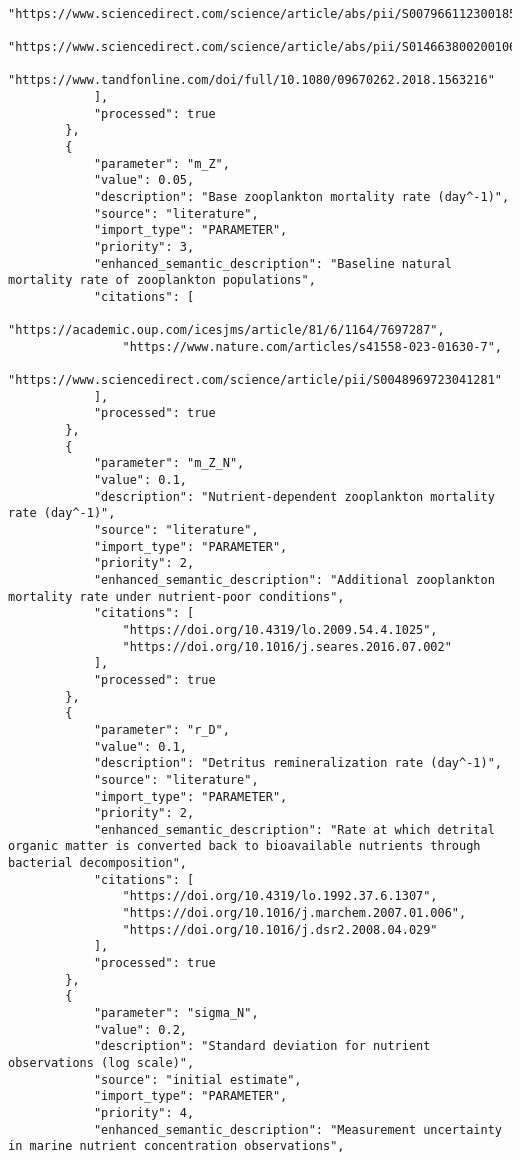 \begin{lstlisting}
                "https://www.sciencedirect.com/science/article/abs/pii/S0079661123001854",
                "https://www.sciencedirect.com/science/article/abs/pii/S0146638002001067",
                "https://www.tandfonline.com/doi/full/10.1080/09670262.2018.1563216"
            ],
            "processed": true
        },
        {
            "parameter": "m_Z",
            "value": 0.05,
            "description": "Base zooplankton mortality rate (day^-1)",
            "source": "literature",
            "import_type": "PARAMETER",
            "priority": 3,
            "enhanced_semantic_description": "Baseline natural mortality rate of zooplankton populations",
            "citations": [
                "https://academic.oup.com/icesjms/article/81/6/1164/7697287",
                "https://www.nature.com/articles/s41558-023-01630-7",
                "https://www.sciencedirect.com/science/article/pii/S0048969723041281"
            ],
            "processed": true
        },
        {
            "parameter": "m_Z_N",
            "value": 0.1,
            "description": "Nutrient-dependent zooplankton mortality rate (day^-1)",
            "source": "literature",
            "import_type": "PARAMETER",
            "priority": 2,
            "enhanced_semantic_description": "Additional zooplankton mortality rate under nutrient-poor conditions",
            "citations": [
                "https://doi.org/10.4319/lo.2009.54.4.1025",
                "https://doi.org/10.1016/j.seares.2016.07.002"
            ],
            "processed": true
        },
        {
            "parameter": "r_D",
            "value": 0.1,
            "description": "Detritus remineralization rate (day^-1)",
            "source": "literature",
            "import_type": "PARAMETER",
            "priority": 2,
            "enhanced_semantic_description": "Rate at which detrital organic matter is converted back to bioavailable nutrients through bacterial decomposition",
            "citations": [
                "https://doi.org/10.4319/lo.1992.37.6.1307",
                "https://doi.org/10.1016/j.marchem.2007.01.006",
                "https://doi.org/10.1016/j.dsr2.2008.04.029"
            ],
            "processed": true
        },
        {
            "parameter": "sigma_N",
            "value": 0.2,
            "description": "Standard deviation for nutrient observations (log scale)",
            "source": "initial estimate",
            "import_type": "PARAMETER",
            "priority": 4,
            "enhanced_semantic_description": "Measurement uncertainty in marine nutrient concentration observations",

\end{lstlisting}
